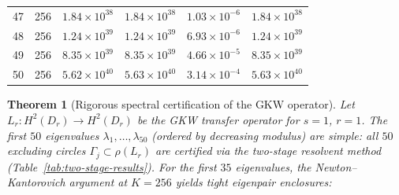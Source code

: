 \documentclass[11pt]{article}
\newtheorem{theorem}{Theorem}
\begin{document}
\begin{longtable}{rlrrrr}
47 & 256 & $1.84 \times 10^{38}$ & $1.84 \times 10^{38}$ & $1.03 \times 10^{-6}$ & $1.84 \times 10^{38}$ \\
48 & 256 & $1.24 \times 10^{39}$ & $1.24 \times 10^{39}$ & $6.93 \times 10^{-6}$ & $1.24 \times 10^{39}$ \\
49 & 256 & $8.35 \times 10^{39}$ & $8.35 \times 10^{39}$ & $4.66 \times 10^{-5}$ & $8.35 \times 10^{39}$ \\
50 & 256 & $5.62 \times 10^{40}$ & $5.63 \times 10^{40}$ & $3.14 \times 10^{-4}$ & $5.63 \times 10^{40}$ \\
\bottomrule
\end{longtable}

\begin{theorem}[Rigorous spectral certification of the GKW operator]
\label{thm:two-stage}
Let $L_r : H^2(D_r) \to H^2(D_r)$ be the GKW transfer operator for $s=1$,
$r = 1$.  The first $50$ eigenvalues $\lambda_1, \ldots, \lambda_{50}$
(ordered by decreasing modulus) are simple: all $50$ excluding circles
$\Gamma_j \subset \rho(L_r)$ are certified via the two-stage resolvent method
(Table~\ref{tab:two-stage-results}).  For the first $35$ eigenvalues,
the Newton--Kantorovich argument at $K = 256$ yields tight eigenpair enclosures:
\begin{enumerate}


\end{enumerate}
\end{theorem}
\end{document}
